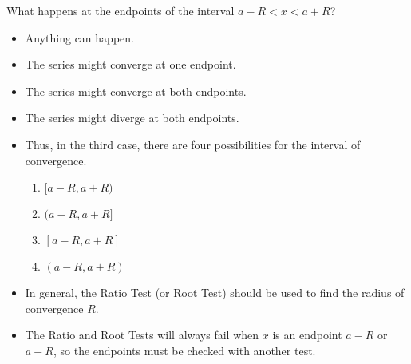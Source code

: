 \begin{frame}[t]
What happens at the endpoints of the interval $a - R < x < a + R$?
\begin{itemize}
\item<2->  Anything can happen.
\item<3-| alert@5>  The series might converge at one endpoint.
\item<3-| alert@6>  The series might converge at both endpoints.
\item<3-| alert@7>  The series might diverge at both endpoints.
\item<4->  Thus, in the third case, there are four possibilities for the interval of convergence.
\begin{enumerate}
\item<5-| alert@5>  $[a-R, a+R)$
\item<5-| alert@5>  $(a-R, a+R]$
\item<6-| alert@6>  $[a-R, a+R]$
\item<7-| alert@7>  $(a-R, a+R)$
\end{enumerate}
\item<8->  In general, the Ratio Test (or Root Test) should be used to find the radius of convergence $R$.
\item<9->  The Ratio and Root Tests will always fail when $x$ is an endpoint $a - R$ or $a + R$, so the endpoints must be checked with another test.
\end{itemize}
\end{frame}
